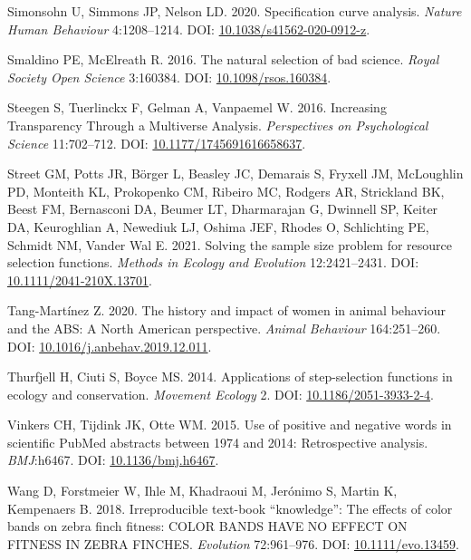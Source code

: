 \documentclass[10pt,a4paper]{article}
\newlength{\cslhangindent}
\newenvironment{CSLReferences}[2] %
 {\begin{list}{}{%
  \setlength{\itemindent}{0pt}
  \setlength{\leftmargin}{0pt}
  \setlength{\parsep}{0pt}
  \ifodd #1
   \setlength{\leftmargin}{\cslhangindent}
   \setlength{\itemindent}{-1\cslhangindent}
  \fi
  \setlength{\itemsep}{#2\baselineskip}}}
 {\end{list}}
\begin{document}
\begin{CSLReferences}{1}{0}
Simonsohn U, Simmons JP, Nelson LD. 2020. Specification curve analysis. \emph{Nature Human Behaviour} 4:1208--1214. DOI: \href{https://doi.org/10.1038/s41562-020-0912-z}{10.1038/s41562-020-0912-z}.

Smaldino PE, McElreath R. 2016. The natural selection of bad science. \emph{Royal Society Open Science} 3:160384. DOI: \href{https://doi.org/10.1098/rsos.160384}{10.1098/rsos.160384}.

Steegen S, Tuerlinckx F, Gelman A, Vanpaemel W. 2016. Increasing {Transparency} {Through} a {Multiverse} {Analysis}. \emph{Perspectives on Psychological Science} 11:702--712. DOI: \href{https://doi.org/10.1177/1745691616658637}{10.1177/1745691616658637}.

Street GM, Potts JR, Börger L, Beasley JC, Demarais S, Fryxell JM, McLoughlin PD, Monteith KL, Prokopenko CM, Ribeiro MC, Rodgers AR, Strickland BK, Beest FM, Bernasconi DA, Beumer LT, Dharmarajan G, Dwinnell SP, Keiter DA, Keuroghlian A, Newediuk LJ, Oshima JEF, Rhodes O, Schlichting PE, Schmidt NM, Vander Wal E. 2021. Solving the sample size problem for resource selection functions. \emph{Methods in Ecology and Evolution} 12:2421--2431. DOI: \href{https://doi.org/10.1111/2041-210X.13701}{10.1111/2041-210X.13701}.

Tang-Martínez Z. 2020. The history and impact of women in animal behaviour and the {ABS}: A {North} {American} perspective. \emph{Animal Behaviour} 164:251--260. DOI: \href{https://doi.org/10.1016/j.anbehav.2019.12.011}{10.1016/j.anbehav.2019.12.011}.

Thurfjell H, Ciuti S, Boyce MS. 2014. Applications of step-selection functions in ecology and conservation. \emph{Movement Ecology} 2. DOI: \href{https://doi.org/10.1186/2051-3933-2-4}{10.1186/2051-3933-2-4}.

Vinkers CH, Tijdink JK, Otte WM. 2015. Use of positive and negative words in scientific {PubMed} abstracts between 1974 and 2014: Retrospective analysis. \emph{BMJ}:h6467. DOI: \href{https://doi.org/10.1136/bmj.h6467}{10.1136/bmj.h6467}.

Wang D, Forstmeier W, Ihle M, Khadraoui M, Jerónimo S, Martin K, Kempenaers B. 2018. Irreproducible text-book {``knowledge''}: {The} effects of color bands on zebra finch fitness: {COLOR} {BANDS} {HAVE} {NO} {EFFECT} {ON} {FITNESS} {IN} {ZEBRA} {FINCHES}. \emph{Evolution} 72:961--976. DOI: \href{https://doi.org/10.1111/evo.13459}{10.1111/evo.13459}.


\end{CSLReferences}
\end{document}
